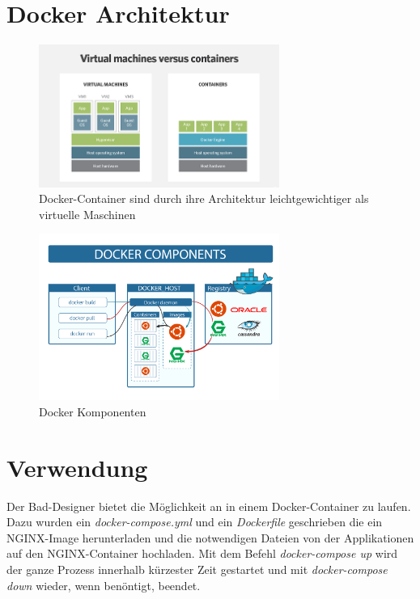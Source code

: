 \section*{Docker Architektur}
\begin{figure}[!h]
	\begin{center}
		\includegraphics[width=0.7\textwidth]{images/container_vs_vm.png}
		\caption{Docker-Container sind durch ihre Architektur leichtgewichtiger als virtuelle Maschinen ~\cite{docker_101}}
	\end{center}
\end{figure}

\begin{figure}[!b]
	\begin{center}
		\includegraphics[width=0.7\textwidth]{images/docker_architecture.png}
		\caption{Docker Komponenten ~\cite{docker_101}}
	\end{center}
\end{figure}

\section*{Verwendung}
Der Bad-Designer bietet die Möglichkeit an in einem Docker-Container zu laufen. Dazu wurden ein \textit{docker-compose.yml} und ein \textit{Dockerfile} geschrieben die ein NGINX-Image herunterladen und die notwendigen Dateien von der Applikationen auf den NGINX-Container hochladen. Mit dem Befehl \textit{docker-compose up} wird der ganze Prozess innerhalb kürzester Zeit gestartet und mit \textit{docker-compose down} wieder, wenn benöntigt, beendet. 